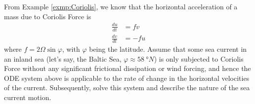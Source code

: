 \begin{exmp}
From Example \ref{exmp:Coriolis}, we know that the horizontal acceleration of a mass due to Coriolis Force is
\begin{align*}
\frac{du}{dt} &= fv \\
\frac{dv}{dt} &= -fu
\end{align*}
where $f = 2\Omega \sin\varphi$, with $\varphi$ being the latitude. Assume that some sea current in an inland sea (let's say, the Baltic Sea, $\varphi \approx \SI{58}{\degree N}$) is only subjected to Coriolis Force without any significant frictional dissipation or wind forcing, and hence the ODE system above is applicable to the rate of change in the horizontal velocities of the current. Subsequently, solve this system and describe the nature of the sea current motion.
\end{exmp}
